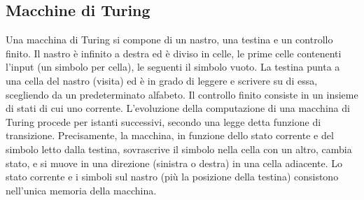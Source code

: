 \subsection{Macchine di Turing}
Una macchina di Turing si compone di un nastro, una testina e un controllo finito. Il nastro è infinito a destra ed è diviso in celle, le prime celle contenenti l'input (un simbolo per cella), le seguenti il simbolo vuoto. La testina punta a una cella del nastro (visita) ed è in grado di leggere e scrivere su di essa, scegliendo da un predeterminato alfabeto. Il controllo finito consiste in un insieme di stati di cui uno corrente. L'evoluzione della computazione di una macchina di Turing procede per istanti successivi, secondo una legge detta funzione di transizione. Precisamente, la macchina, in funzione dello stato corrente e del simbolo letto dalla testina, sovrascrive il simbolo nella cella con un altro, cambia stato, e si muove in una direzione (sinistra o destra) in una cella adiacente. Lo stato corrente e i simboli sul nastro (più la posizione della testina) consistono nell'unica memoria della macchina.

